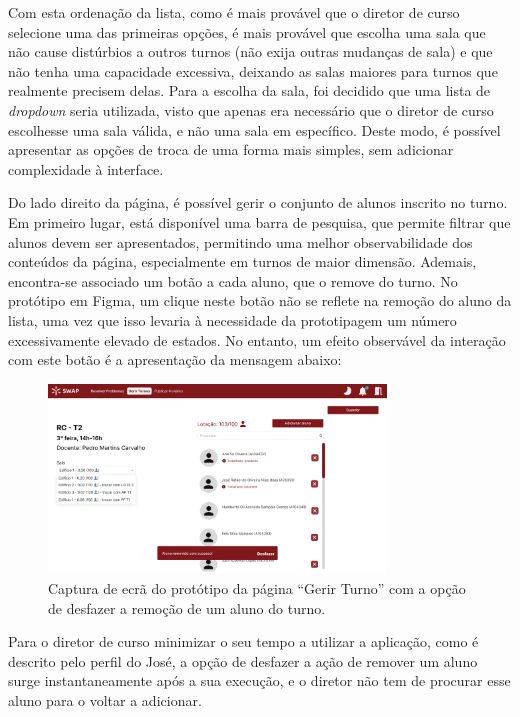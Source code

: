 \documentclass[12pt, a4paper]{article}
\begin{document}
Com esta ordenação da lista, como é mais provável que o diretor de curso selecione uma das primeiras
opções, é mais provável que escolha uma sala que não cause distúrbios a outros turnos (não exija
outras mudanças de sala) e que não tenha uma capacidade excessiva, deixando as salas maiores para
turnos que realmente precisem delas. Para a escolha da sala, foi decidido que uma lista de
\emph{dropdown} seria utilizada, visto que apenas era necessário que o diretor de curso escolhesse
uma sala válida, e não uma sala em específico. Deste modo, é possível apresentar as opções de troca
de uma forma mais simples, sem adicionar complexidade à interface.

Do lado direito da página, é possível gerir o conjunto de alunos inscrito no turno. Em primeiro
lugar, está disponível uma barra de pesquisa, que permite filtrar que alunos devem ser apresentados,
permitindo uma melhor observabilidade dos conteúdos da página, especialmente em turnos de maior
dimensão. Ademais, encontra-se associado um botão a cada aluno, que o remove do turno. No protótipo
em Figma, um clique neste botão não se reflete na remoção do aluno da lista, uma vez que isso
levaria à necessidade da prototipagem um número excessivamente elevado de estados. No entanto, um
efeito observável da interação com este botão é a apresentação da mensagem abaixo:

\begin{figure}[H]
    \centering
    \includegraphics[width=0.8\textwidth]{res/prototype/gerir-turno-desfazer.png}
    \caption{
        \onehalfspacing
        Captura de ecrã do protótipo da página ``Gerir Turno'' com a opção de desfazer a remoção de
        um aluno do turno.
    }
    \label{gerir-turno-desfazer}
\end{figure}

Para o diretor de curso minimizar o seu tempo a utilizar a aplicação, como é descrito pelo perfil
do José, a opção de desfazer a ação de remover um aluno surge instantaneamente após a sua execução,
e o diretor não tem de procurar esse aluno para o voltar a adicionar.
\end{document}
